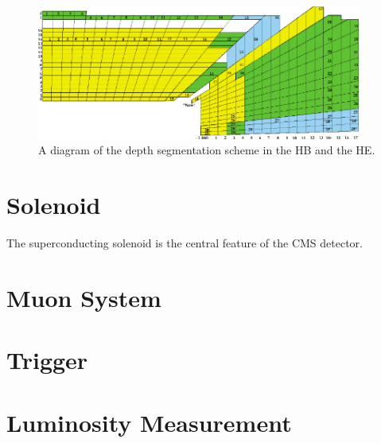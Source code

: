 \begin{figure}[hbt]
\begin{center}
\includegraphics[width=0.95\textwidth]{figures/HCAL_tower_segmentation.pdf}
\caption{A diagram of the depth segmentation scheme in the HB and the HE.}
\label{fig:hcal-depths}
\end{center}
\end{figure}

\section{Solenoid}

The superconducting solenoid is the central feature of the CMS detector. 

\section{Muon System}

\section{Trigger}

\section{Luminosity Measurement}